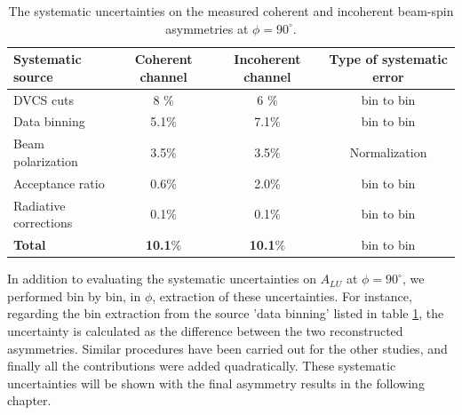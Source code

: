 \begin {table}[!h]
\begin{center}
\begin{tabular}{|l|c|c|c|}
\hline
\bf Systematic source & \bf  Coherent channel  & \bf Incoherent channel & \bf Type of systematic 
error\\
\hline
DVCS cuts & 8 $\%$ &  6 $\%$ & bin to bin\\
\hline
Data binning & 5.1$\%$ & 7.1$\%$ &bin to bin\\
\hline
Beam polarization &  3.5$\%$ &  3.5$\%$& Normalization\\
\hline
Acceptance ratio &  0.6$\%$ &  2.0$\%$ &bin to bin\\
\hline
Radiative corrections &  0.1$\%$ & 0.1$\%$ & bin to bin\\
\hline
\textbf{Total} &  \textbf{10.1}$\%$ &   \textbf{10.1}$\%$ &bin to 
bin\\
\hline
\end{tabular}
\caption{The systematic uncertainties on the measured coherent and incoherent 
beam-spin asymmetries at $\phi = 90^{\circ}$.}
\label{Table:systematic_uncertainties}
\end{center}
\end{table}

In addition to evaluating the systematic uncertainties on $A_{LU}$ at $\phi = 
90^{\circ}$, we performed bin by bin, in $\phi$, extraction of these 
uncertainties. For instance, regarding the bin extraction from the source 'data 
binning' listed in table \ref{Table:systematic_uncertainties}, the uncertainty 
is calculated as the difference between the two reconstructed asymmetries.  
Similar procedures have been carried out for the other studies, and finally all 
the contributions were added quadratically. These systematic uncertainties will 
be shown with the final asymmetry results in the following chapter.  
